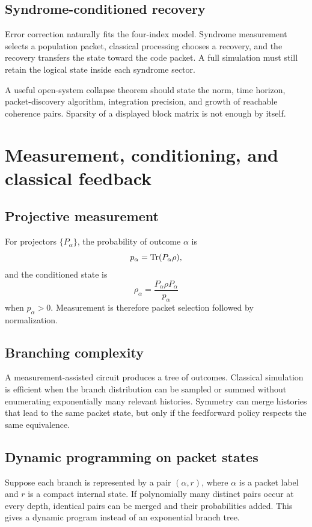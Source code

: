 \subsection{Syndrome-conditioned recovery}
Error correction naturally fits the four-index model. Syndrome measurement selects a population packet, classical processing chooses a recovery, and the recovery transfers the state toward the code packet. A full simulation must still retain the logical state inside each syndrome sector.

\begin{frontierbox}
A useful open-system collapse theorem should state the norm, time horizon, packet-discovery algorithm, integration precision, and growth of reachable coherence pairs. Sparsity of a displayed block matrix is not enough by itself.
\end{frontierbox}

\section{Measurement, conditioning, and classical feedback}
\label{s:ch:measurement}

\subsection{Projective measurement}
For projectors $\{P_\alpha\}$, the probability of outcome $\alpha$ is
\[
p_\alpha
=
\operatorname{Tr}(P_\alpha\rho),
\]
and the conditioned state is
\[
\rho_\alpha
=
\frac{P_\alpha\rho P_\alpha}{p_\alpha}
\]
when $p_\alpha>0$. Measurement is therefore packet selection followed by normalization.

\subsection{Branching complexity}
A measurement-assisted circuit produces a tree of outcomes. Classical simulation is efficient when the branch distribution can be sampled or summed without enumerating exponentially many relevant histories. Symmetry can merge histories that lead to the same packet state, but only if the feedforward policy respects the same equivalence.

\subsection{Dynamic programming on packet states}
Suppose each branch is represented by a pair $(\alpha,r)$, where $\alpha$ is a packet label and $r$ is a compact internal state. If polynomially many distinct pairs occur at every depth, identical pairs can be merged and their probabilities added. This gives a dynamic program instead of an exponential branch tree.

